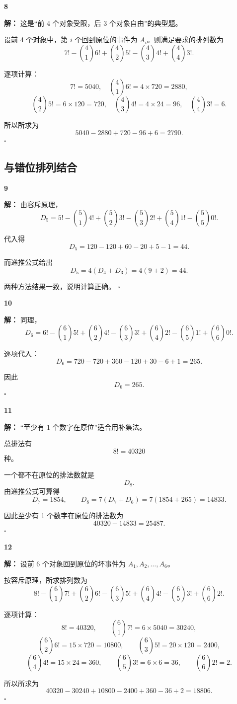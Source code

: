 \documentclass[11pt,a4paper,fontset=fandol]{ctexart}
\theoremstyle{formalexample}
\newenvironment{solution}{\par\noindent\textbf{解：}}{\hfill$\square$\par}
\begin{document}
\textbf{8}\begin{solution}
这是“前 4 个对象受限，后 3 个对象自由”的典型题。

设前 4 个对象中，第 $i$ 个回到原位的事件为 $A_i$。则满足要求的排列数为
\[
7!-\binom41 6!+\binom42 5!-\binom43 4!+\binom44 3!.
\]

逐项计算：
\[
7!=5040,
\quad
\binom41 6!=4\times 720=2880,
\]
\[
\binom42 5!=6\times 120=720,
\quad
\binom43 4!=4\times 24=96,
\quad
\binom44 3!=6.
\]

所以所求为
\[
5040-2880+720-96+6=2790.
\]
\end{solution}

\subsection*{与错位排列结合}

\textbf{9}\begin{solution}
由容斥原理，
\[
D_5=5!-\binom51 4!+\binom52 3!-\binom53 2!+\binom54 1!-\binom55 0!.
\]

代入得
\[
D_5=120-120+60-20+5-1=44.
\]

而递推公式给出
\[
D_5=4(D_4+D_3)=4(9+2)=44.
\]

两种方法结果一致，说明计算正确。
\end{solution}

\textbf{10}\begin{solution}
同理，
\[
D_6=6!-\binom61 5!+\binom62 4!-\binom63 3!+\binom64 2!-\binom65 1!+\binom66 0!.
\]

逐项代入：
\[
D_6=720-720+360-120+30-6+1=265.
\]

因此
\[
D_6=265.
\]
\end{solution}

\textbf{11}\begin{solution}
“至少有 1 个数字在原位”适合用补集法。

总排法有
\[
8!=40320
\]
种。

一个都不在原位的排法数就是
\[
D_8.
\]
由递推公式可算得
\[
D_7=1854,
\qquad
D_8=7(D_7+D_6)=7(1854+265)=14833.
\]

因此至少有 1 个数字在原位的排法数为
\[
40320-14833=25487.
\]
\end{solution}

\textbf{12}\begin{solution}
设前 6 个对象回到原位的坏事件为 $A_1,A_2,\ldots,A_6$。

按容斥原理，所求排列数为
\[
8!-\binom61 7!+\binom62 6!-\binom63 5!+\binom64 4!-\binom65 3!+\binom66 2!.
\]

逐项计算：
\[
8!=40320,
\qquad
\binom61 7!=6\times 5040=30240,
\]
\[
\binom62 6!=15\times 720=10800,
\qquad
\binom63 5!=20\times 120=2400,
\]
\[
\binom64 4!=15\times 24=360,
\qquad
\binom65 3!=6\times 6=36,
\qquad
\binom66 2!=2.
\]

所以所求为
\[
40320-30240+10800-2400+360-36+2=18806.
\]
\end{solution}
\end{document}
